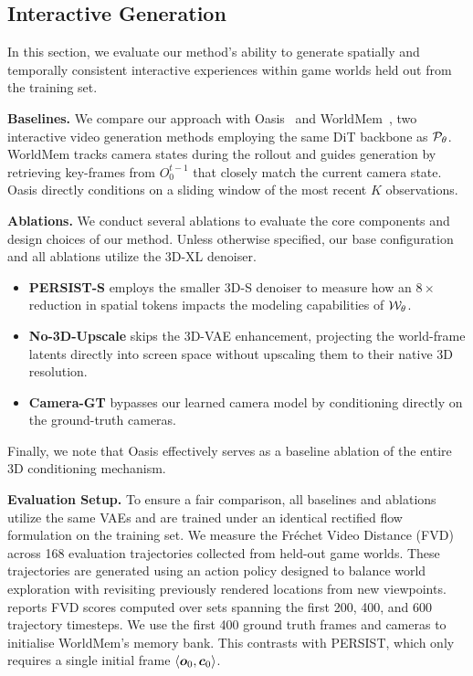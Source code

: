 \subsection{Interactive Generation}

In this section, we evaluate our method's ability to generate spatially and temporally consistent interactive experiences within game worlds held out from the training set.

\textbf{Baselines.} We compare our approach with Oasis~\citep{decart2024oasis} and WorldMem~\citep{xiao2025worldmem}, two interactive video generation methods employing the same DiT backbone as ${\mathcal{P}}_\theta$. WorldMem tracks camera states during the rollout and guides generation by retrieving key-frames from $O^{t-1}_0$ that closely match the current camera state. Oasis directly conditions on a sliding window of the most recent $K$ observations.

\textbf{Ablations.} We conduct several ablations to evaluate the core components and design choices of our method. Unless otherwise specified, our base configuration and all ablations utilize the 3D-XL denoiser.
\begin{itemize}[leftmargin=*,nosep]
\item \textbf{PERSIST-S} employs the smaller 3D-S denoiser to measure how an $8\times$ reduction in spatial tokens impacts the modeling capabilities of ${\mathcal{W}}_\theta$.
\item \textbf{No-3D-Upscale} skips the 3D-VAE enhancement, projecting the world-frame latents directly into screen space without upscaling them to their native 3D resolution.
\item \textbf{Camera-GT} bypasses our learned camera model by conditioning directly on the ground-truth cameras.
\end{itemize}
Finally, we note that Oasis effectively serves as a baseline ablation of the entire 3D conditioning mechanism.

\textbf{Evaluation Setup.} To ensure a fair comparison, all baselines and ablations utilize the same VAEs and are trained under an identical rectified flow formulation on the training set. We measure the Fréchet Video Distance (FVD)~\citep{unterthiner2018towards} across 168 evaluation trajectories collected from held-out game worlds. These trajectories are generated using an action policy designed to balance world exploration with revisiting previously rendered locations from new viewpoints.  reports FVD scores computed over sets spanning the first 200, 400, and 600 trajectory timesteps. We use the first 400 ground truth frames and cameras to initialise WorldMem's memory bank. This contrasts with PERSIST, which only requires a single initial frame $\langle {\bm{o}}_0, {\bm{c}}_0 \rangle$.

